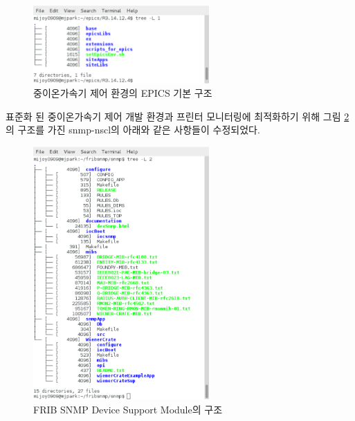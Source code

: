 \documentclass[11pt
  , a4paper
  , article
  , oneside
]{memoir}
\begin{document}
\begin{figure}[h!]
  \centering
  \includegraphics[width=0.6\textwidth]{./images/epicstree.eps}
  \caption{중이온가속기 제어 환경의 EPICS 기본 구조}
  \label{fig:epicstree}   
\end{figure}


\clearpage
표준화 된 중이온가속기 제어 개발 환경과 프린터 모니터링에 최적화하기 위해 그림 \ref{fig:fribtree}의 구조를 가진 snmp-nscl의 아래와 같은 사항들이 수정되었다.

\begin{figure}[h!]
  \centering
  \includegraphics[width=0.6\textwidth]{./images/fribmoduletree.eps}
  \caption{FRIB SNMP Device Support Module의 구조}
  \label{fig:fribtree}  
\end{figure}
\end{document}

